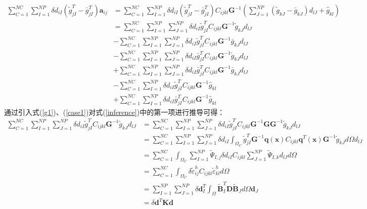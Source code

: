 \begin{equation}\label{inference}
\begin{split}
    \sum_{C=1}^{N\!C}\sum_{I=1}^{N\!P}\delta d_{iI}(\tilde{g}_{jI}^T-\bar{g}_{jI}^T)\pmb{a}_{ij}&=\sum_{C=1}^{N\!C}\sum_{I=1}^{N\!P}\delta d_{iI}(\tilde{g}_{jI}^T-\bar{g}_{jI}^T)C_{ijkl}\pmb{G}^{-1}(\sum_{J=1}^{N\!P}(\tilde{g}_{kJ}-\bar{g}_{kJ})d_{lJ}+\hat{g}_{kl})\\
    &=\sum_{C=1}^{N\!C}\sum_{I=1}^{N\!P}\sum_{J=1}^{N\!P}\delta d_{iI}\tilde{g}^T_{jI}C_{ijkl}\pmb{G}^{-1}\tilde{g}_{kJ}d_{lJ}\\
    &-\sum_{C=1}^{N\!C}\sum_{I=1}^{N\!P}\sum_{J=1}^{N\!P}\delta d_{iI}\tilde{g}^T_{jI}C_{ijkl}\pmb{G}^{-1}\bar{g}_{kJ}d_{lJ}\\
    &-\sum_{C=1}^{N\!C}\sum_{I=1}^{N\!P}\sum_{J=1}^{N\!P}\delta d_{iI}\bar{g}^T_{jI}C_{ijkl}\pmb{G}^{-1}\tilde{g}_{kJ}d_{lJ}\\
    &+\sum_{C=1}^{N\!C}\sum_{I=1}^{N\!P}\sum_{J=1}^{N\!P}\delta d_{iI}\bar{g}^T_{jI}C_{ijkl}\pmb{G}^{-1}\bar{g}_{kJ}d_{lJ}\\
    &-\sum_{C=1}^{N\!C}\sum_{I=1}^{N\!P}\delta d_{iI}\tilde{g}_{jI}^TC_{ijkl}\pmb{G}^{-1}\hat{g}_{kl}\\
    &+\sum_{C=1}^{N\!C}\sum_{I=1}^{N\!P}\delta d_{iI}\bar{g}_{jI}^TC_{ijkl}\pmb{G}^{-1}\hat{g}_{kl}
\end{split}
\end{equation}
通过引入式(\ref{g1})、(\ref{case1})对式(\ref{inference})中的第一项进行推导可得：
\begin{equation}
\begin{split}
    \sum_{C=1}^{N\!C}\sum_{I=1}^{N\!P}\sum_{J=1}^{N\!P}\delta d_{iI}\tilde{g}^T_{jI}C_{ijkl}\pmb{G}^{-1}\tilde{g}_{kJ}d_{lJ}&=\sum_{C=1}^{N\!C}\sum_{I=1}^{N\!P}\sum_{J=1}^{N\!P}\delta d_{iI}\tilde{g}^T_{jI}C_{ijkl}\pmb{G}^{-1}\pmb{G}\pmb{G}^{-1}\tilde{g}_{kJ}d_{lJ}\\
&=\sum_{C=1}^{N\!C}\sum_{I=1}^{N\!P}\sum_{J=1}^{N\!P}\delta d_{iI}\int_{\Omega_C}\tilde{g}_{jI}^T\pmb{G}^{-1}\pmb{q}(\pmb{x})C_{ijkl}\pmb{q}^T(\pmb{x})\pmb{G}^{-1}\tilde{g}_{kJ}d\Omega d_{lJ}\\
&=\sum_{C=1}^{N\!C}\int_{\Omega_C}\sum_{I=1}^{N\!P}\tilde{\Psi}_{I,j}\delta d_{iI}C_{ijkl}\sum_{J=1}^{N\!P}\tilde{\Psi}_{I,k}d_{lJ}d\Omega\\
&=\sum_{C=1}^{N\!C}\int_{\Omega_C}\delta\tilde{\varepsilon}_{ij}^hC_{ijkl}\tilde{\varepsilon}_{kl}^hd\Omega\\
&=\sum_{I=1}^{N\!P}\sum_{J=1}^{N\!P}\delta\pmb{d}^T_I\int_{\Omega}\tilde{\pmb{B}}_I^T\pmb{D}\tilde{\pmb{B}}_Jd\Omega\pmb{d}_J\\
&=\delta\pmb{d}^T\pmb{K}\pmb{d}
\end{split}
\end{equation}
